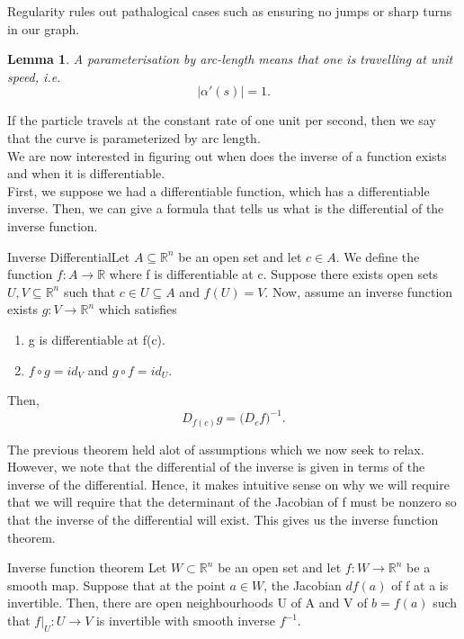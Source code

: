 \documentclass[twoside]{article}
\newtheorem{lemma}[theorem]{Lemma}
\begin{document}
Regularity rules out pathalogical cases such as ensuring no jumps or sharp turns in our graph.

\begin{lemma}A parameterisation by arc-length means that one is travelling at unit speed, i.e. $$|\alpha'(s)| = 1.$$
\end{lemma}

If the particle travels at the constant rate of one unit per second, then we say that the curve is parameterized by arc length.\\

We are now interested in figuring out when does the inverse of a function exists and when it is differentiable.\\

First, we suppose we had a differentiable function, which has a differentiable inverse. Then, we can give a formula that tells us what is the differential of the inverse function.

\begin{theorem_exam}{Inverse Differential}{}Let $A \subseteq \mathbb{R}^n$ be an open set and let $c \in A.$ We define the function $f: A \rightarrow \mathbb{R}$ where f is differentiable at c. Suppose there exists open sets $U, V \subseteq \mathbb{R}^n$ such that $c \in U \subseteq A$ and $f(U) = V.$ Now, assume an inverse function exists $g: V \rightarrow \mathbb{R}^n$ which satisfies 
\begin{enumerate}
\item g is differentiable at f(c).
\item $f \circ g = id_V$ and $g \circ f = id_U.$
\end{enumerate}
Then,
$$
D_{f(c)}g = \bigg(D_cf \bigg)^{-1}.
$$
\end{theorem_exam}

The previous theorem held alot of assumptions which we now seek to relax. However, we note that the differential of the inverse is given in terms of the inverse of the differential. Hence, it makes intuitive sense on why we will require that we will require that the determinant of the Jacobian of f must be nonzero so that the inverse of the differential will exist. This gives us the inverse function theorem.

\begin{theorem_exam}{Inverse function theorem}{} Let $W \subset \mathbb{R}^n$ be an open set and let $f: W \rightarrow \mathbb{R}^n$ be a smooth map. Suppose that at the point $a \in W$, the Jacobian $df(a)$ of f at a is invertible. Then, there are open neighbourhoods U of A and V of $b = f(a)$ such that $f|_U: U \rightarrow V$ is invertible with smooth inverse $f^{-1}.$
\end{theorem_exam}
\end{document}
